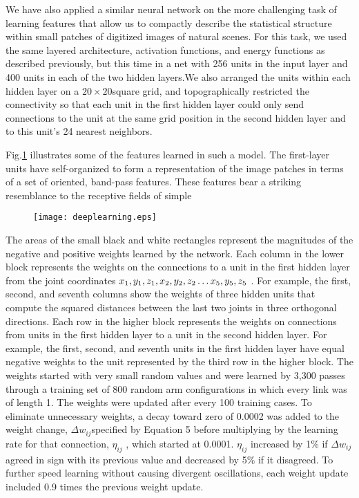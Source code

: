 \par{We have also applied a similar neural network on the more challenging task of learning features that allow us to compactly describe the statistical structure within small patches of digitized images of natural scenes. For this task, we used the same layered architecture, activation functions, and energy functions as described previously, but this time in a net with 256 units in the input layer and 400 units in each of the two hidden layers.We also arranged the units within each hidden layer on a $20 \times 20 $square grid, and topographically restricted the connectivity so that each unit in the first hidden layer could only send connections to the unit at the same grid position in the second hidden layer and to this unit’s 24 nearest neighbors.
}\par{Fig.\ref{fig:deeplearning} illustrates some of the features learned in such a model. The first-layer units have self-organized to form a representation of the image patches in terms of a set of oriented, band-pass features. These features bear a striking resemblance to the receptive fields of simple
\begin{figure}[htbp]
\centering
\texttt{[image: deeplearning.eps]}
\label{fig:deeplearning}
\vspace{\baselineskip} %
\end{figure}
\par{
\footnotesize
 The areas of the small black and white rectangles represent the magnitudes of the negative and positive weights learned by the network. Each column in the lower block represents the weights on the connections to a unit in the first hidden layer from the joint coordinates ${x_1},{\rm{ }}{y_1},{\rm{ }}{z_1},{\rm{ }}{x_2},{\rm{ }}{y_2},{\rm{ }}{z_2} \ldots {x_5},{\rm{ }}{y_5},{\rm{ }}{z_5}$  . For example, the first, second, and seventh columns show the weights of three hidden units that compute the squared distances between the last two joints in three orthogonal directions. Each row in the higher block represents the weights on connections from units in the first hidden layer to a unit in the second hidden layer. For example, the first, second, and seventh units in the first hidden layer have equal negative weights to the unit represented by the third row in the higher block. The weights started with very small random values and were learned by 3,300 passes through a training set of 800 random arm configurations in which every link was of length 1. The weights were updated after every 100 training cases. To eliminate unnecessary weights, a decay toward zero of 0.0002 was added to the weight change,   $\Delta {w_{ij}}$specified by Equation 5 before multiplying by the learning rate for that connection, ${\eta _{ij}}$ , which started at 0.0001. ${\eta _{ij}}$ increased by 1\% if  $\Delta {w_{ij}}$ agreed in sign with its previous value and decreased by 5\% if it disagreed. To further speed learning without causing divergent oscillations, each weight update included 0.9 times the previous weight update.}

}
